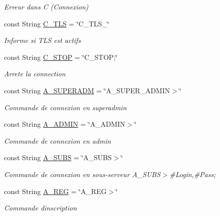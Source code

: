 \begin{DoxyCompactItemize}
\begin{DoxyCompactList}\small\item\em Erreur dans C (Connexion) \end{DoxyCompactList}\item 
const String \mbox{\hyperlink{struct_n_t_k_1_1_n_t_k_commands_a63df0f0187cf9c5f144468b3e918c6e1}{C\+\_\+\+T\+LS}} = \char`\"{}C\+\_\+\+T\+L\+S\+\_\+\char`\"{}
\begin{DoxyCompactList}\small\item\em Informe si T\+LS est actifs \end{DoxyCompactList}\item 
const String \mbox{\hyperlink{struct_n_t_k_1_1_n_t_k_commands_a96c5ba1d63303e8975f8f6ed9ab50c02}{C\+\_\+\+S\+T\+OP}} = \char`\"{}C\+\_\+\+S\+T\+OP;\char`\"{}
\begin{DoxyCompactList}\small\item\em Arrete la connection \end{DoxyCompactList}\item 
const String \mbox{\hyperlink{struct_n_t_k_1_1_n_t_k_commands_ab4657fd309d8b7232abf9e121461b936}{A\+\_\+\+S\+U\+P\+E\+R\+A\+DM}} = \char`\"{}A\+\_\+\+S\+U\+P\+E\+R\+\_\+\+A\+D\+M\+IN$>$\char`\"{}
\begin{DoxyCompactList}\small\item\em Commande de connexion en superadmin \end{DoxyCompactList}\item 
const String \mbox{\hyperlink{struct_n_t_k_1_1_n_t_k_commands_acdd4bd5a7ed9cb74be22c2338bdcb13b}{A\+\_\+\+A\+D\+M\+IN}} = \char`\"{}A\+\_\+\+A\+D\+M\+IN$>$\char`\"{}
\begin{DoxyCompactList}\small\item\em Commande de connexion en admin \end{DoxyCompactList}\item 
const String \mbox{\hyperlink{struct_n_t_k_1_1_n_t_k_commands_a6c9a7bfbb102e3affa71cf60ab1d3a7c}{A\+\_\+\+S\+U\+BS}} = \char`\"{}A\+\_\+\+S\+U\+BS$>$\char`\"{}
\begin{DoxyCompactList}\small\item\em Commande de connexion en sous-\/serveur A\+\_\+\+S\+U\+BS$>$\#\+Login,\#\+Pass; \end{DoxyCompactList}\item 
const String \mbox{\hyperlink{struct_n_t_k_1_1_n_t_k_commands_a0625831eeedafd85d45682c4e41c5ba2}{A\+\_\+\+R\+EG}} = \char`\"{}A\+\_\+\+R\+EG$>$\char`\"{}
\begin{DoxyCompactList}\small\item\em Commande d\textquotesingle{}inscription \end{DoxyCompactList}\item 

\end{DoxyCompactItemize}
